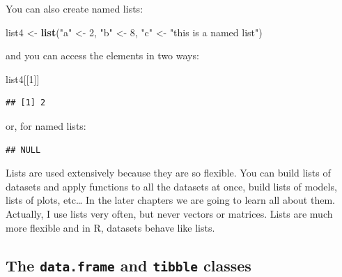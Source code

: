 \documentclass[]{gitbook}
\newenvironment{Shaded}{\begin{snugshade}}{\end{snugshade}}
\newcommand{\DecValTok}[1]{\textcolor[rgb]{0.00,0.00,0.81}{#1}}
\newcommand{\KeywordTok}[1]{\textcolor[rgb]{0.13,0.29,0.53}{\textbf{#1}}}
\newcommand{\NormalTok}[1]{#1}
\newcommand{\OperatorTok}[1]{\textcolor[rgb]{0.81,0.36,0.00}{\textbf{#1}}}
\newcommand{\StringTok}[1]{\textcolor[rgb]{0.31,0.60,0.02}{#1}}
\theoremstyle{definition}
\theoremstyle{definition}
\theoremstyle{definition}
\theoremstyle{remark}
\begin{document}
You can also create named lists:

\begin{Shaded}
\begin{Highlighting}[]
\NormalTok{list4 <-}\StringTok{ }\KeywordTok{list}\NormalTok{(}\StringTok{"a"}\NormalTok{ <-}\StringTok{ }\DecValTok{2}\NormalTok{, }\StringTok{"b"}\NormalTok{ <-}\StringTok{ }\DecValTok{8}\NormalTok{, }\StringTok{"c"}\NormalTok{ <-}\StringTok{ "this is a named list"}\NormalTok{)}
\end{Highlighting}
\end{Shaded}

and you can access the elements in two ways:

\begin{Shaded}
\begin{Highlighting}[]
\NormalTok{list4[[}\DecValTok{1}\NormalTok{]]}
\end{Highlighting}
\end{Shaded}

\begin{verbatim}
## [1] 2
\end{verbatim}

or, for named lists:

\begin{Shaded}
\end{Shaded}

\begin{verbatim}
## NULL
\end{verbatim}

Lists are used extensively because they are so flexible. You can build
lists of datasets and apply functions to all the datasets at once, build
lists of models, lists of plots, etc\ldots{} In the later chapters we
are going to learn all about them. Actually, I use lists very often, but
never vectors or matrices. Lists are much more flexible and in R,
datasets behave like lists.

\hypertarget{the-data.frame-and-tibble-classes}{%
\subsection{\texorpdfstring{The \texttt{data.frame} and \texttt{tibble}
classes}{The data.frame and tibble classes}}\label{the-data.frame-and-tibble-classes}}
\end{document}
